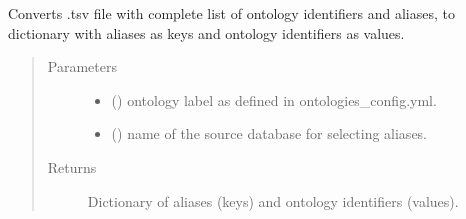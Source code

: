 \documentclass[letterpaper,10pt,english]{sphinxmanual}
\begin{document}
\begin{fulllineitems}
\label{\detokenize{_autosummary/graphdb_builder:graphdb_builder.mapping.getMappingFromOntology}}
Converts .tsv file with complete list of ontology identifiers and aliases,
to dictionary with aliases as keys and ontology identifiers as values.
\begin{quote}\begin{description}
\item[{Parameters}] \leavevmode\begin{itemize}
\item {} 
 () \textendash{} ontology label as defined in ontologies\_config.yml.

\item {} 
 () \textendash{} name of the source database for selecting aliases.

\end{itemize}

\item[{Returns}] \leavevmode
Dictionary of aliases (keys) and ontology identifiers (values).

\end{description}\end{quote}

\end{fulllineitems}


\begin{fulllineitems}
\label{\detokenize{_autosummary/graphdb_builder:graphdb_builder.mapping.getMappingFromDatabase}}
\end{fulllineitems}
\end{document}
